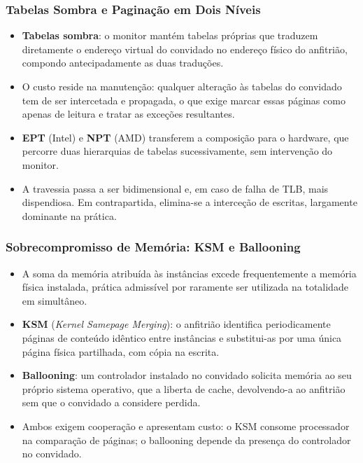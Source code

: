 \documentclass[aspectratio=169]{beamer}
\begin{document}
\begin{frame}
\frametitle{Tabelas Sombra e Paginação em Dois Níveis}
\begin{itemize}
    \setlength\itemsep{0.35cm}
    \item \textbf{Tabelas sombra}: o monitor mantém tabelas próprias que traduzem diretamente o endereço virtual do convidado no endereço físico do anfitrião, compondo antecipadamente as duas traduções.
    \item O custo reside na manutenção: qualquer alteração às tabelas do convidado tem de ser intercetada e propagada, o que exige marcar essas páginas como apenas de leitura e tratar as exceções resultantes.
    \item \textbf{EPT} (Intel) e \textbf{NPT} (AMD) transferem a composição para o hardware, que percorre duas hierarquias de tabelas sucessivamente, sem intervenção do monitor.
    \item A travessia passa a ser bidimensional e, em caso de falha de TLB, mais dispendiosa. Em contrapartida, elimina-se a interceção de escritas, largamente dominante na prática.
\end{itemize}
\end{frame}

\begin{frame}
\frametitle{Sobrecompromisso de Memória: KSM e Ballooning}
\begin{itemize}
    \setlength\itemsep{0.35cm}
    \item A soma da memória atribuída às instâncias excede frequentemente a memória física instalada, prática admissível por raramente ser utilizada na totalidade em simultâneo.
    \item \textbf{KSM} (\emph{Kernel Samepage Merging}): o anfitrião identifica periodicamente páginas de conteúdo idêntico entre instâncias e substitui-as por uma única página física partilhada, com cópia na escrita.
    \item \textbf{Ballooning}: um controlador instalado no convidado solicita memória ao seu próprio sistema operativo, que a liberta de cache, devolvendo-a ao anfitrião sem que o convidado a considere perdida.
    \item Ambos exigem cooperação e apresentam custo: o KSM consome processador na comparação de páginas; o ballooning depende da presença do controlador no convidado.
\end{itemize}
\end{frame}
\end{document}
